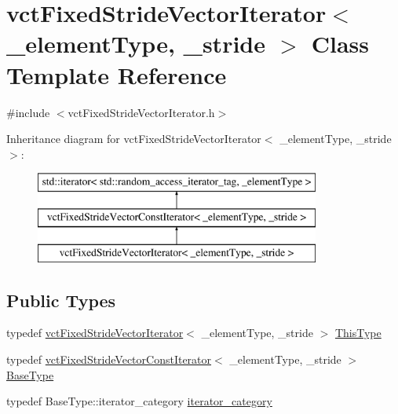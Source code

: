 \hypertarget{classvct_fixed_stride_vector_iterator}{}\section{vct\+Fixed\+Stride\+Vector\+Iterator$<$ \+\_\+element\+Type, \+\_\+stride $>$ Class Template Reference}
\label{classvct_fixed_stride_vector_iterator}


{\ttfamily \#include $<$vct\+Fixed\+Stride\+Vector\+Iterator.\+h$>$}

Inheritance diagram for vct\+Fixed\+Stride\+Vector\+Iterator$<$ \+\_\+element\+Type, \+\_\+stride $>$\+:\begin{figure}[H]
\begin{center}
\leavevmode
\includegraphics[height=3.000000cm]{d8/d66/classvct_fixed_stride_vector_iterator}
\end{center}
\end{figure}
\subsection*{Public Types}
\begin{DoxyCompactItemize}
\item 
typedef \hyperlink{classvct_fixed_stride_vector_iterator}{vct\+Fixed\+Stride\+Vector\+Iterator}$<$ \+\_\+element\+Type, \+\_\+stride $>$ \hyperlink{classvct_fixed_stride_vector_iterator_a2a515ead5522ffc2eb376b301053d5f2}{This\+Type}
\item 
typedef \hyperlink{classvct_fixed_stride_vector_const_iterator}{vct\+Fixed\+Stride\+Vector\+Const\+Iterator}$<$ \+\_\+element\+Type, \+\_\+stride $>$ \hyperlink{classvct_fixed_stride_vector_iterator_a3f9c3435364bd43064a82e9b1446f3be}{Base\+Type}
\item 
typedef Base\+Type\+::iterator\+\_\+category \hyperlink{classvct_fixed_stride_vector_iterator_a2f2031bcd38f41975bc90a9f3b8af46f}{iterator\+\_\+category}
\end{DoxyCompactItemize}
